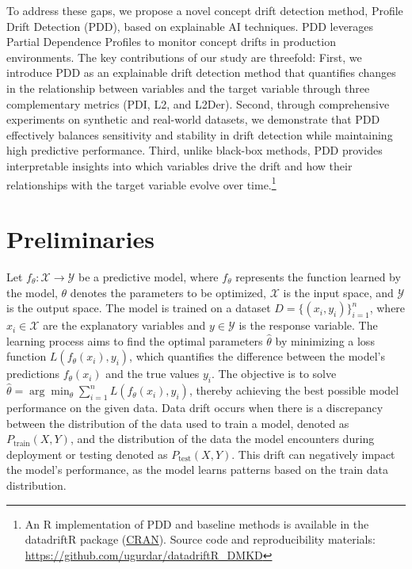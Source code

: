 \documentclass[pdflatex,sn-mathphys-ay]{sn-jnl}%
\theoremstyle{thmstyleone}%
\theoremstyle{thmstyletwo}%
\theoremstyle{thmstylethree}%
\begin{document}
To address these gaps, we propose a novel concept drift detection method, Profile Drift Detection (PDD), based on explainable AI techniques. PDD leverages Partial Dependence Profiles to monitor concept drifts in production environments. The key contributions of our study are threefold: First, we introduce PDD as an explainable drift detection method that quantifies changes in the relationship between variables and the target variable through three complementary metrics (PDI, L2, and L2Der). Second, through comprehensive experiments on synthetic and real-world datasets, we demonstrate that PDD effectively balances sensitivity and stability in drift detection while maintaining high predictive performance. Third, unlike black-box methods, PDD provides interpretable insights into which variables drive the drift and how their relationships with the target variable evolve over time.\footnote{An R implementation of PDD and baseline methods is available in the datadriftR package (\href{https://cran.r-project.org/package=datadriftR}{CRAN}). Source code and reproducibility materials: \href{https://github.com/ugurdar/datadriftR_DMKD}{https://github.com/ugurdar/datadriftR\_DMKD}}


\section{Preliminaries}

Let $f_{\theta}: \mathcal{X} \rightarrow \mathcal{Y}$ be a predictive model, where $f_{\theta}$ represents the function learned by the model, $\theta$ denotes the parameters to be optimized, $\mathcal{X}$ is the input space, and $\mathcal{Y}$ is the output space. The model is trained on a dataset $D = \{(x_i, y_i)\}_{i=1}^{n}$, where $x_i \in \mathcal{X}$ are the explanatory variables and $y \in \mathcal{Y}$ is the response variable. The learning process aims to find the optimal parameters $\hat{\theta}$ by minimizing a loss function $L(f_{\theta}(x_i), y_i)$, which quantifies the difference between the model's predictions $f_{\theta}(x_i)$ and the true values $y_i$. The objective is to solve $\hat{\theta} = \arg \min_{\theta} \sum_{i=1}^{n} L(f_{\theta}(x_i), y_i)$, thereby achieving the best possible model performance on the given data. Data drift occurs when there is a discrepancy between the distribution of the data used to train a model, denoted as $P_{\text{train}}(X, Y)$, and the distribution of the data the model encounters during deployment or testing denoted as $P_{\text{test}}(X, Y)$. This drift can negatively impact the model's performance, as the model learns patterns based on the train data distribution.\\
\end{document}
